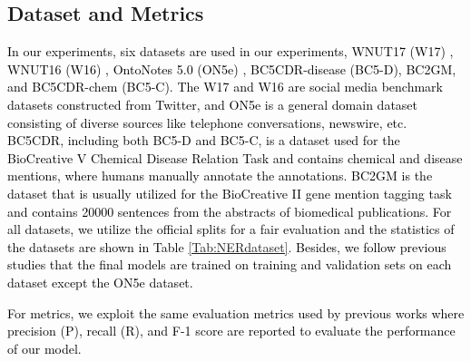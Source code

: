 \documentclass[11pt]{article}
\begin{document}
\subsection{Dataset and Metrics}
\textcolor{black}{
In our experiments, six datasets are used in our experiments, WNUT17 (W17) \cite{w16}, WNUT16 (W16) \cite{w17}, OntoNotes 5.0 (ON5e) \cite{pradhan2013towards}, BC5CDR-disease (BC5-D), BC2GM, and BC5CDR-chem (BC5-C).
The W17 and W16 are social media benchmark datasets constructed from Twitter, and ON5e is a general domain dataset consisting of diverse sources like telephone conversations, newswire, etc.
\textcolor{black}{BC5CDR, including both BC5-D and BC5-C, is a dataset used for the BioCreative V Chemical Disease Relation Task and contains chemical and disease mentions, where humans manually annotate the annotations.} 
BC2GM is the dataset that is usually utilized for the BioCreative II gene mention tagging task and contains 20000 sentences from the abstracts of biomedical publications.
For all datasets, we utilize the official splits for a fair evaluation and the statistics of the datasets are shown in Table \ref{Tab:NERdataset}.
Besides, we follow previous studies that the final models are trained on training and validation sets on each dataset except the ON5e dataset.
}

\textcolor{black}{For metrics, we exploit the same evaluation metrics used by previous works where precision (P), recall (R), and F-1 score are reported to evaluate the performance of our model.
}
\end{document}
